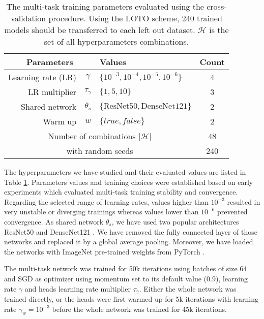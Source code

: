 \begin{table}
    \centering
    \caption{The multi-task training parameters evaluated using the cross-validation procedure. Using the LOTO scheme, 240 trained models should be transferred to each left out dataset. $\mathcal{H}$ is the set of all hyperparameters combinations.}
    \label{tab:mtask:results:parameters}
    \begin{tabular}{|rc|l|c|}
        \hline
        \multicolumn{2}{|c|}{Parameters} & Values & Count \\
        \hline
        Learning rate (LR) & $\gamma$ & $\{10^{-3}, 10^{-4}, 10^{-5}, 10^{-6}\}$ & 4 \\
        LR multiplier & $\tau_\gamma$ & $\{1, 5, 10\}$ & 3 \\
        Shared network & $\theta_s$ & $\{\text{ResNet50}, \text{DenseNet121}\}$ & 2 \\
        Warm up & $w$ & $\{true, false\}$ & 2 \\
        \hline
        \multicolumn{3}{|c|}{Number of combinations $\left|\mathcal{H}\right|$} & 48 \\
        \hline
        \multicolumn{3}{|c|}{with random seeds} & 240 \\
        \hline
    \end{tabular}
\end{table}

The hyperparameters we have studied and their evaluated values are listed in Table \ref{tab:mtask:results:parameters}. Parameters values and training choices were established based on early experiments which evaluated multi-task training stability and convergence. Regarding the selected range of learning rates, values higher than $10^{-3}$ resulted in very unstable or diverging trainings whereas values lower than $10^{-6}$ prevented convergence. As shared network $\theta_s$, we have used two popular architectures ResNet50 \parencite{he2016deep} and DenseNet121 \parencite{huang2017densely}. We have removed the fully connected layer of those networks and replaced it by a global average pooling. Moreover, we have loaded the networks with ImageNet pre-trained weights from PyTorch \parencite{paszke2019pytorch}.

The multi-task network was trained for 50k iterations using batches of size 64 and SGD as optimizer using momentum set to its default value (\ie $0.9$), learning rate $\gamma$ and heads learning rate multiplier $\tau_\gamma$. Either the whole network was trained directly, or the heads were first warmed up for 5k iterations with learning rate $\gamma_w = 10^{-3}$ before the whole network was trained for 45k iterations.

